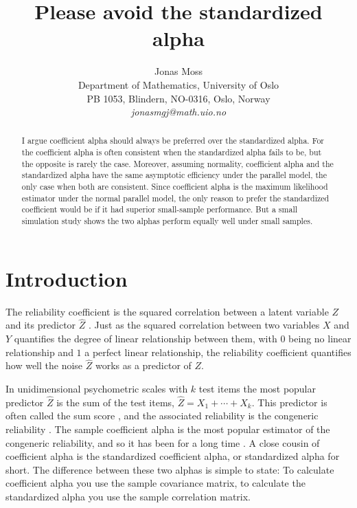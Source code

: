 \documentclass{article}
\title{Please avoid the standardized alpha}
\author{
  Jonas Moss \\
  Department of Mathematics, University of Oslo\\
  PB 1053, Blindern, NO-0316, Oslo, Norway \\
  \it{jonasmgj@math.uio.no}
}
\theoremstyle{plain}
\theoremstyle{plain}
\theoremstyle{definition}
\theoremstyle{remark}
\theoremstyle{definition}
\theoremstyle{plain}
\theoremstyle{plain}
\theoremstyle{definition}
\begin{document}
\maketitle

\begin{abstract}
I argue coefficient alpha should always be preferred over the standardized alpha. For the coefficient alpha is often consistent when the standardized alpha fails to be, but the opposite is rarely the case. Moreover, assuming normality, coefficient alpha and the standardized alpha have the same asymptotic efficiency under the parallel model, the only case when both are consistent. Since coefficient alpha is the maximum likelihood estimator under the normal parallel model, the only reason to prefer the standardized coefficient would be if it had superior small-sample performance. But a small simulation study shows the two alphas perform equally well under small samples.
\end{abstract}


\section{Introduction}
The reliability coefficient is the squared correlation between a latent variable $Z$ and its predictor $\hat{Z}$ \citep[][p. 61]{Lord1968-ax}. Just as the squared correlation between two variables $X$ and $Y$ quantifies the degree of linear relationship between them, with $0$ being no linear relationship and $1$ a perfect linear relationship, the reliability coefficient quantifies how well the noise $\hat{Z}$ works as a predictor of $Z$.

In unidimensional psychometric scales with $k$ test items the most popular predictor $\hat{Z}$ is the sum of the test items, $\hat{Z}=X_1 + \cdots + X_k$. This predictor is often called the sum score \citep{McNeish2019-ea}, and the associated reliability is the congeneric reliability \citep{Cho2016-bs}. The sample coefficient alpha is the most popular estimator of the congeneric reliability, and so it has been for a long time \citep{McNeish2018-vu}. A close cousin of coefficient alpha is the standardized coefficient alpha, or standardized alpha for short. The difference between these two alphas is simple to state: To calculate coefficient alpha you use the sample covariance matrix, to calculate the standardized alpha you use the sample correlation matrix.
\end{document}

